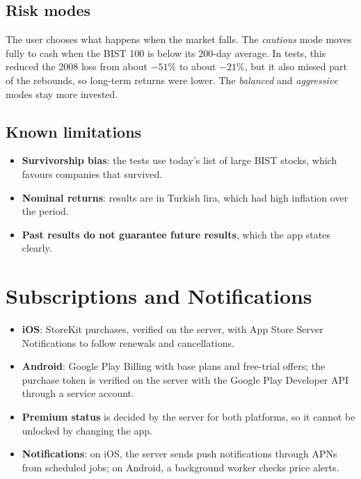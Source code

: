 \documentclass[a4paper,11pt]{article}
\begin{document}
\subsection*{Risk modes}
The user chooses what happens when the market falls. The \emph{cautious} mode moves fully to cash when the BIST 100 is below its 200-day average. In tests, this reduced the 2008 loss from about $-51\%$ to about $-21\%$, but it also missed part of the rebounds, so long-term returns were lower. The \emph{balanced} and \emph{aggressive} modes stay more invested.

\subsection*{Known limitations}
\begin{itemize}
  \item \textbf{Survivorship bias}: the tests use today's list of large BIST stocks, which favours companies that survived.
  \item \textbf{Nominal returns}: results are in Turkish lira, which had high inflation over the period.
  \item \textbf{Past results do not guarantee future results}, which the app states clearly.
\end{itemize}

\section{Subscriptions and Notifications}

\begin{itemize}
  \item \textbf{iOS}: StoreKit purchases, verified on the server, with App Store Server Notifications to follow renewals and cancellations.
  \item \textbf{Android}: Google Play Billing with base plans and free-trial offers; the purchase token is verified on the server with the Google Play Developer API through a service account.
  \item \textbf{Premium status} is decided by the server for both platforms, so it cannot be unlocked by changing the app.
  \item \textbf{Notifications}: on iOS, the server sends push notifications through APNs from scheduled jobs; on Android, a background worker checks price alerts.
\end{itemize}

\end{document}
